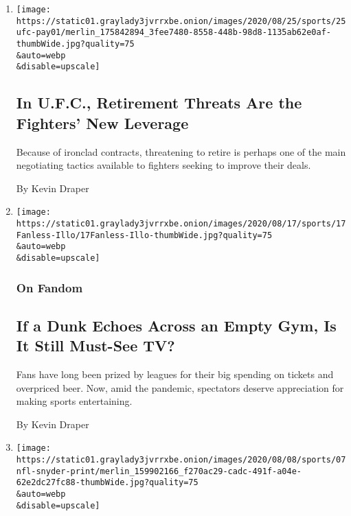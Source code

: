 \begin{enumerate}
\def\labelenumi{\arabic{enumi}.}
\item
  \href{/2020/08/26/sports/ufc-fighter-pay.html}{}

  \texttt{[image: https://static01.graylady3jvrrxbe.onion/images/2020/08/25/sports/25ufc-pay01/merlin\_175842894\_3fee7480-8558-448b-98d8-1135ab62e0af-thumbWide.jpg?quality=75\\\&auto=webp\\\&disable=upscale]}

  \hypertarget{in-ufc-retirement-threats-are-the-fighters-new-leverage}{%
  \subsection{In U.F.C., Retirement Threats Are the Fighters' New
  Leverage}\label{in-ufc-retirement-threats-are-the-fighters-new-leverage}}

  Because of ironclad contracts, threatening to retire is perhaps one of
  the main negotiating tactics available to fighters seeking to improve
  their deals.

  By Kevin Draper
\item
  \href{/2020/08/17/sports/sports-fans-television.html}{}

  \texttt{[image: https://static01.graylady3jvrrxbe.onion/images/2020/08/17/sports/17Fanless-Illo/17Fanless-Illo-thumbWide.jpg?quality=75\\\&auto=webp\\\&disable=upscale]}

  \hypertarget{on-fandom}{%
  \subsubsection{On Fandom}\label{on-fandom}}

  \hypertarget{if-a-dunk-echoes-across-an-empty-gym-is-it-still-must-see-tv}{%
  \subsection{If a Dunk Echoes Across an Empty Gym, Is It Still Must-See
  TV?}\label{if-a-dunk-echoes-across-an-empty-gym-is-it-still-must-see-tv}}

  Fans have long been prized by leagues for their big spending on
  tickets and overpriced beer. Now, amid the pandemic, spectators
  deserve appreciation for making sports entertaining.

  By Kevin Draper
\item
  \href{/2020/08/07/sports/dan-snyder-washington-nfl-defamation-lawsuit.html}{}

  \texttt{[image: https://static01.graylady3jvrrxbe.onion/images/2020/08/08/sports/07nfl-snyder-print/merlin\_159902166\_f270ac29-cadc-491f-a04e-62e2dc27fc88-thumbWide.jpg?quality=75\\\&auto=webp\\\&disable=upscale]}


\end{enumerate}
